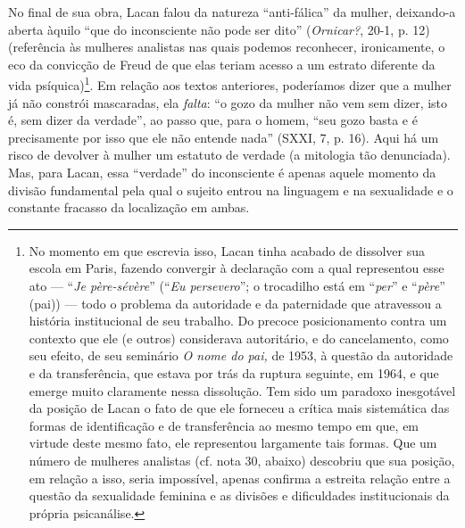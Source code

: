 No final de sua obra, Lacan falou da natureza ``anti-fálica'' da mulher,
deixando-a aberta àquilo ``que do inconsciente não pode ser dito''
(\emph{Ornicar?}, 20-1, p. 12) (referência às mulheres analistas nas
quais podemos reconhecer, ironicamente, o eco da convicção de Freud de
que elas teriam acesso a um estrato diferente da vida
psíquica)\footnote{No momento em que escrevia isso, Lacan tinha acabado
  de dissolver sua escola em Paris, fazendo convergir à declaração com a
  qual representou esse ato --- ``\emph{Je père-sévère}'' (``\emph{Eu
  persevero}''; o trocadilho está em ``\emph{per}'' e ``\emph{père}''
  (pai)) --- todo o problema da autoridade e da paternidade que
  atravessou a história institucional de seu trabalho. Do precoce
  posicionamento contra um contexto que ele (e outros) considerava
  autoritário, e do cancelamento, como seu efeito, de seu seminário
  \emph{O nome do pai,} de 1953, à questão da autoridade e da
  transferência, que estava por trás da ruptura seguinte, em 1964, e que
  emerge muito claramente nessa dissolução. Tem sido um paradoxo
  inesgotável da posição de Lacan o fato de que ele forneceu a crítica
  mais sistemática das formas de identificação e de transferência ao
  mesmo tempo em que, em virtude deste mesmo fato, ele representou
  largamente tais formas. Que um número de mulheres analistas (cf. nota
  30, abaixo) descobriu que sua posição, em relação a isso, seria
  impossível, apenas confirma a estreita relação entre a questão da
  sexualidade feminina e as divisões e dificuldades institucionais da
  própria psicanálise.}. Em relação aos textos anteriores, poderíamos
dizer que a mulher já não constrói mascaradas, ela \emph{falta}: ``o
gozo da mulher não vem sem dizer, isto é, sem dizer da verdade'', ao
passo que, para o homem, ``seu gozo basta e é precisamente por isso que
ele não entende nada'' (SXXI, 7, p. 16). Aqui há um risco de devolver à
mulher um estatuto de verdade (a mitologia tão denunciada). Mas, para
Lacan, essa ``verdade'' do inconsciente é apenas aquele momento da
divisão fundamental pela qual o sujeito entrou na linguagem e na
sexualidade e o constante fracasso da localização em ambas.

